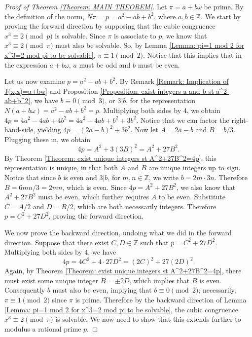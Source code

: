 \documentclass[10pt]{amsart}
\newcommand{\ZZ}{\mathbb{Z}}
\theoremstyle{plain}
\theoremstyle{definition}
\theoremstyle{remark}
\numberwithin{equation}{section}
\begin{document}
\begin{proof}
[Proof of Theorem \ref{Theorem: MAIN THEOREM}]
    Let $\pi=a+b\omega$ be prime. By the definition of the norm, $N\pi=p=a^{2}-ab+b^{2}$, where $a,b\in\ZZ$. We start by proving the forward direction by supposing that the cubic congruence $x^{3}\equiv 2\pmod{p}$ is solvable. Since $\pi$ is associate to $p$, we know that $x^{3}\equiv 2\pmod{\pi}$ must also be solvable. So, by Lemma \ref{Lemma: pi=1 mod 2 for x^3=2 mod pi to be solvable}, $\pi\equiv 1\pmod{2}$. Notice that this implies that in the expression $a+b\omega$, $a$ must be odd and $b$ must be even.

    \indent Let us now examine $p=a^{2}-ab+b^{2}$. By Remark \ref{Remark: Implication of J(x,x)=a+bw} and Proposition \ref{Proposition: exist integers a and b st a^2-ab+b^2}, we have $b\equiv 0\pmod{3}$, or $3|b$, for the representation $N(a+b\omega) = a^{2}-ab+b^{2} = p$. Multiplying both sides by 4, we obtain $4p=4a^{2}-4ab+4b^{2}=4a^{2}-4ab+b^{2}+3b^{2}$. Notice that we can factor the right-hand-side, yielding $4p=(2a-b)^{2}+3b^{2}$. Now let $A=2a-b$ and $B=b/3$. Plugging these in, we obtain
    \begin{equation*}
        4p = A^{2}+3(3B)^{2} = A^{2}+27B^{2}.
    \end{equation*}
    By Theorem \ref{Theorem: exist unique integers st A^2+27B^2=4p}, this representation is unique, in that both $A$ and $B$ are unique integers up to sign. Notice that since $b$ is even and $3|b$, for $m,n\in\ZZ$, we write $b=2m\cdot 3n$. Therefore $B=6mn/3=2mn$, which is even. Since $4p = A^{2}+27B^{2}$, we also know that $A^{2}+27B^{2}$ must be even, which further requires $A$ to be even. Substitute $C=A/2$ and $D=B/2$, which are both necessarily integers. Therefore $p=C^{2}+27D^{2}$, proving the forward direction.

    \indent We now prove the backward direction, undoing what we did in the forward direction. Suppose that there exist $C,D\in\ZZ$ such that $p=C^{2}+27D^{2}$. Multiplying both sides by $4$, we have
    \begin{equation*}
        4p = 4C^{2}+4\cdot 27D^{2} = (2C)^{2}+27(2D)^{2}.
    \end{equation*}
    Again, by Theorem \ref{Theorem: exist unique integers st A^2+27B^2=4p}, there must exist some unique integer $B=\pm 2D$, which implies that $B$ is even. Consequently $b$ must also be even, implying that $b\equiv 0\pmod{2}$; necessarily, $\pi\equiv 1\pmod{2}$ since $\pi$ is prime. Therefore by the backward direction of Lemma \ref{Lemma: pi=1 mod 2 for x^3=2 mod pi to be solvable}, the cubic congruence $x^{3}\equiv 2\pmod{\pi}$ is solvable. We now need to show that this extends further to modulus a rational prime $p$. 


\end{proof}
\end{document}
